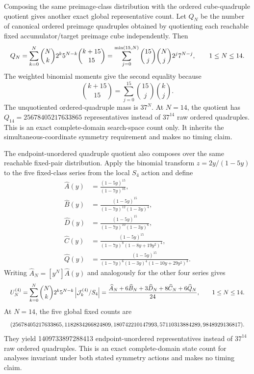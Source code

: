 \documentclass{article}
\newcommand{\fitmath}[1]{\resizebox{0.99\linewidth}{!}{$\displaystyle #1$}}
\begin{document}
Composing the same preimage-class distribution with the ordered cube-quadruple
quotient gives another exact global representative count. Let $Q_N$ be the
number of canonical ordered preimage quadruples obtained by quotienting each
reachable fixed accumulator/target preimage cube independently. Then
\begin{equation}
  \fitmath{%
    Q_N
      =\sum_{k=0}^{N}\binom{N}{k}2^k5^{N-k}\binom{k+15}{15}
      =\sum_{j=0}^{\min(15,N)}
        \binom{15}{j}\binom{N}{j}2^j7^{N-j},
    \qquad 1\leq N\leq14.
  }
  \label{eq:optimization-crazy-global-ordered-preimage-quadruple-quotient}
\end{equation}
The weighted binomial moments give the second equality because
\[
  \binom{k+15}{15}=\sum_{j=0}^{15}\binom{15}{j}\binom{k}{j}.
\]
The unquotiented ordered-quadruple mass is $37^N$. At $N=14$, the quotient has
$Q_{14}=25678405217633865$ representatives instead of $37^{14}$ raw ordered
quadruples. This is an exact complete-domain search-space count only. It
inherits the simultaneous-coordinate symmetry requirement and makes no timing
claim.

The endpoint-unordered quadruple quotient also composes over the same
reachable fixed-pair distribution. Apply the binomial transform
$z=2y/(1-5y)$ to the five fixed-class series from the local $S_4$ action and
define
\[
  \begin{aligned}
    \widehat A(y)&=\frac{(1-5y)^{15}}{(1-7y)^{16}},\\
    \widehat B(y)&=
      \frac{(1-5y)^{15}}{(1-7y)^{12}(1-3y)^4},\\
    \widehat D(y)&=
      \frac{(1-5y)^{15}}{(1-7y)^{10}(1-3y)^6},\\
    \widehat C(y)&=
      \frac{(1-5y)^{15}}{(1-7y)^8(1-8y+19y^2)^4},\\
    \widehat Q(y)&=
      \frac{(1-5y)^{15}}
      {(1-7y)^6(1-3y)^4(1-10y+29y^2)^3}.
  \end{aligned}
\]
Writing $\widehat A_N=[y^N]\widehat A(y)$ and analogously for the other
four series gives
\begin{equation}
  \fitmath{%
    U^{(4)}_N
      =\sum_{k=0}^{N}\binom{N}{k}2^k5^{N-k}
        \left|\mathcal{J}^{(4)}_k/S_4\right|
      =\frac{\widehat A_N+6\widehat B_N+3\widehat D_N
        +8\widehat C_N+6\widehat Q_N}{24},
    \qquad 1\leq N\leq14.
  }
  \label{eq:optimization-crazy-global-unordered-preimage-quadruple-quotient}
\end{equation}
At $N=14$, the five global fixed counts are
\begin{equation*}
  \fitmath{%
    (25678405217633865,1182834266824809,180742210147993,
    57110313884289,9848929136817).
  }
\end{equation*}
They yield 1409733897288413 endpoint-unordered representatives instead of
$37^{14}$ raw ordered quadruples. This is an exact complete-domain state count
for analyses invariant under both stated symmetry actions and makes no timing
claim.
\end{document}
